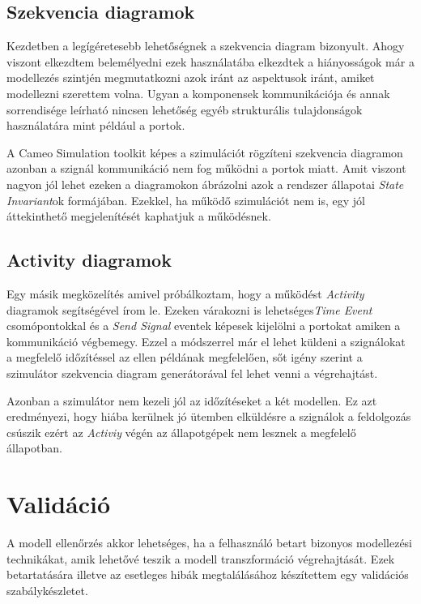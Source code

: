 \subsection{Szekvencia diagramok}

Kezdetben a legígéretesebb lehetőségnek a szekvencia diagram bizonyult. Ahogy viszont elkezdtem belemélyedni ezek használatába elkezdtek a hiányosságok már a modellezés szintjén megmutatkozni azok iránt az aspektusok iránt, amiket modellezni szerettem volna. Ugyan a komponensek kommunikációja és annak sorrendisége leírható nincsen lehetőség egyéb strukturális tulajdonságok használatára mint például a portok.

A Cameo Simulation toolkit képes a szimulációt rögzíteni szekvencia diagramon azonban a szignál kommunikáció nem fog működni a portok miatt. Amit viszont nagyon jól lehet ezeken a diagramokon ábrázolni azok a rendszer állapotai \emph{State Invariant}ok formájában. Ezekkel, ha működő szimulációt nem is, egy jól áttekinthető megjelenítését kaphatjuk a működésnek.

\subsection{Activity diagramok}
Egy másik megközelítés amivel próbálkoztam, hogy a működést \emph{Activity} diagramok segítségével írom le. Ezeken várakozni is lehetséges\emph{Time Event} csomópontokkal és a \emph{Send Signal} eventek képesek kijelölni a portokat amiken a kommunikáció végbemegy. Ezzel a módszerrel már el lehet küldeni a szignálokat a megfelelő időzítéssel az ellen példának megfelelően, sőt igény szerint a szimulátor szekvencia diagram generátorával fel lehet venni a végrehajtást.

Azonban a szimulátor nem kezeli jól az időzítéseket a két modellen. Ez azt eredményezi, hogy hiába kerülnek jó ütemben elküldésre a szignálok a feldolgozás csúszik ezért az \emph{Activiy} végén az állapotgépek nem lesznek a megfelelő állapotban.

\newpage
\section{Validáció}

A modell ellenőrzés akkor lehetséges, ha a felhasználó betart bizonyos modellezési technikákat, amik lehetővé teszik a modell transzformáció végrehajtását. Ezek betartatására illetve az esetleges hibák megtalálásához készítettem egy validációs szabálykészletet.


